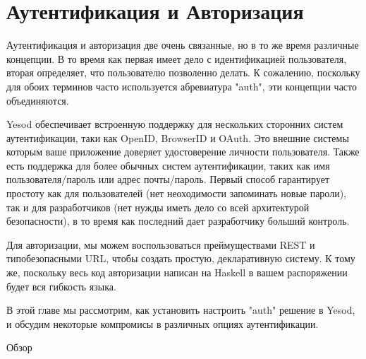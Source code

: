 \chapter{Аутентификация и Авторизация}\label{chap:auth}

Аутентификация и авторизация две очень связанные, но в то же время различные концепции. В то время как первая имеет дело с идентификацией пользователя, вторая определяет, что пользователю позволенно делать. К сожалению, поскольку для обоих терминов часто используется абревиатура "auth", эти концепции часто объединяются.

Yesod обеспечивает встроенную поддержку для нескольких сторонних систем аутентификации, таки как OpenID, BrowserID и OAuth. Это внешние системы которым ваше приложение доверяет удостоверение личности пользователя. Также есть поддержка для более обычных систем аутентификации, таких как имя пользователя/пароль или адрес почты/пароль. Первый способ гарантирует простоту как для пользователей (нет неоходимости запоминать новые пароли), так и для разработчиков (нет нужды иметь дело со всей архитектурой безопасности), в то время как последний дает разработчику больший контроль.

Для авторизации, мы можем воспользоваться преймуществами REST и типобезопасными URL, чтобы создать простую, декларативную систему. К тому же, поскольку весь код авторизации написан на Haskell в вашем распоряжении будет вся гибкость языка.

В этой главе мы рассмотрим, как установить настроить "auth" решение в Yesod, и обсудим некоторые компромисы в различных опциях аутентификации.

Обзор

